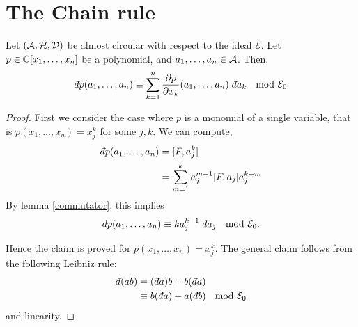 \section{The Chain rule}

\begin{lemma}
\label{polychain}
    Let $(\mathcal{A},\mathcal{H},\mathcal{D})$ be almost circular with respect
    to the ideal $\mathcal{E}$. Let $p \in \mathbb{C}[x_1,\ldots,x_n]$ be a polynomial,
    and $a_1,\ldots,a_n \in \mathcal{A}$. 
    Then,
    \begin{equation}
        \qd p(a_1,\ldots,a_n) \equiv \sum_{k=1}^n \frac{\partial p}{\partial x_k}(a_1,\ldots,a_n)\;\qd a_k\; \mod{\mathcal{E}_0}
    \end{equation}
\end{lemma}
\begin{proof}
    First we consider the case where $p$ is a monomial of a single variable,
    that is $p(x_1,\ldots,x_n) = x_j^k$ for some $j,k$. We can compute,
    \begin{align}
        \qd p(a_1,\ldots,a_n) &= [F,a_j^k] \\
        &= \sum_{m=1}^{k} a_j^{m-1} [F,a_j] a_j^{k-m}
    \end{align}
    By lemma \ref{commutator}, this implies
    \begin{align}
        \qd p(a_1,\ldots,a_n) \equiv ka_j^{k-1}\; \qd a_j\; \mod{\mathcal{E}_0}.
    \end{align}
    
    Hence the claim is proved for $p(x_1,\ldots,x_n) = x_j^k$. The general claim
    follows from the following Leibniz rule:
    \begin{align}
        \qd (ab) &= (\qd a)b + b(\qd a)\\
                 &\equiv b(\qd a) + a(\qd b) \;\mod{\mathcal{E}_0}
    \end{align}
    and linearity.
\end{proof}

